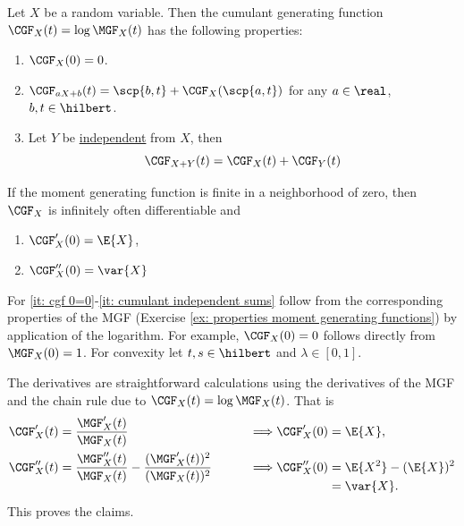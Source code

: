 \begin{exercise}
    \label{ex: properties cumulant generating function}
    Let \(X\) be a random variable. Then the cumulant generating function
    \(\CGF_X(t) = \log \MGF_X(t)\) has the following properties:
    \begin{enumerate}[label=(\roman*), noitemsep]
        \item\label{it: cgf 0=0} \(\CGF_X(0) = 0\).
        \item\label{it: cgf linear} \(\CGF_{aX + b}(t) = \scp{b, t} + \CGF_X(\scp{a, t})\) for any \(a \in \real\), \(b,t\in \hilbert\).
        \item\label{it: cumulant independent sums} Let \(Y\) be \underline{independent} from \(X\), then
        \[
            \CGF_{X+Y}(t) = \CGF_X(t) + \CGF_Y(t)
        \]
    \end{enumerate}
    If the moment generating function is finite in a neighborhood of zero,
    then \(\CGF_X\) is infinitely often differentiable and
    \begin{enumerate}[label=(\roman*), resume, noitemsep]
        \item \(\CGF_X'(0) = \E{X}\),
        \item \(\CGF_X''(0) = \var{X}\)
    \end{enumerate}

    \begin{solution}
        For \ref{it: cgf 0=0}-\ref{it: cumulant independent sums} follow from the
        corresponding properties of the MGF (Exercise \ref{ex: properties moment
        generating functions}) by application of the logarithm.  For example,
        \(\CGF_X(0)=0\) follows directly from \(\MGF_X(0)=1\). For convexity
        let \(t, s\in \hilbert\) and \(\lambda \in [0,1]\). 

        The derivatives are straightforward calculations using the derivatives of the MGF
        and the chain rule due to \(\CGF_X(t) = \log \MGF_X(t)\). That is
        \begin{alignat*}{3}
            \CGF_X'(t)
            &= \frac{\MGF_X'(t)}{\MGF_X(t)}
            \qquad &\implies &\CGF_X'(0) = \E{X},
            \\
            \CGF_X''(t)
            &= \frac{\MGF_X''(t)}{\MGF_X(t)} - \frac{(\MGF_X'(t))^2}{(\MGF_X(t))^2}
            \qquad &\implies &\CGF_X''(0)
            \begin{aligned}[t]
            &= \E{X^2} - (\E{X})^2
            \\
            &= \var{X}.
            \end{aligned}
        \end{alignat*}
        This proves the claims.
    \end{solution}
\end{exercise}

